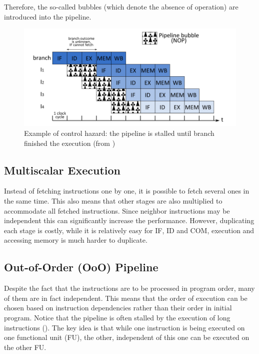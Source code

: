 Therefore, the so-called bubbles (which denote the absence of operation) are introduced into the pipeline.

\begin{figure}
    \includegraphics[width=\textwidth]{figures/pipeline-bubbles.png}
    \caption{Example of control hazard: the pipeline is stalled until branch finished the execution (from \cite{perais_increasing_2016})}
    \label{fig:bubbles}
\end{figure}

\subsection{Multiscalar Execution}

Instead of fetching instructions one by one, it is possible to fetch several ones in the same time. This also means that other stages are also multiplied to accommodate all fetched instructions. Since neighbor instructions may be independent this can significantly increase the performance. However, duplicating each stage is costly, while it is relatively easy for IF, ID and COM, execution and accessing memory is much harder to duplicate.

\subsection{Out-of-Order (OoO) Pipeline}

Despite the fact that the instructions are to be processed in program order, many of them are in fact independent. This means that the order of execution can be chosen based on instruction dependencies rather than their order in initial program. Notice that the pipeline is often stalled by the execution of long instructions (). The key idea is that while one instruction is being executed on one functional unit (FU), the other, independent of this one can be executed on the other FU. 


